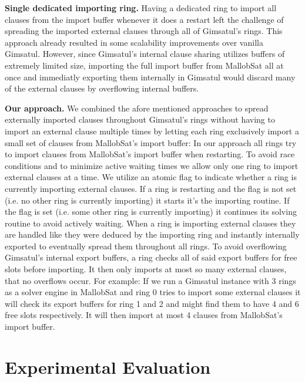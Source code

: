 \documentclass[12pt,a4paper,twoside]{scrartcl}
\numberwithin{equation}{section}
\begin{document}
\textbf{Single dedicated importing ring.} Having a dedicated ring to import all clauses from the import buffer whenever it does a restart left the challenge of spreading the imported external clauses through all of Gimsatul's rings. This approach already resulted in some scalability improvements over vanilla Gimsatul. However, since Gimsatul's internal clause sharing utilizes buffers of extremely limited size, importing the full import buffer from MallobSat all at once and immediatly exporting them internally in Gimsatul would discard many of the external clauses by overflowing internal buffers.

\textbf{Our approach.} We combined the afore mentioned approaches to spread externally imported clauses throughout Gimsatul's rings without having to import an external clause multiple times by letting each ring exclusively import a small set of clauses from MallobSat's import buffer: 
In our approach all rings try to import clauses from MallobSat's import buffer when restarting. To avoid race conditions and to minimize active waiting times we allow only one ring to import external clauses at a time. We utilize an atomic flag to indicate whether a ring is currently importing external clauses. If a ring is restarting and the flag is not set (i.e. no other ring is currently importing) it starts it's the importing routine. If the flag is set (i.e. some other ring is currently importing) it continues its solving routine to avoid actively waiting. 
When a ring is importing external clauses they are handled like they were deduced by the importing ring and instantly internally exported to eventually spread them throughout all rings. 
To avoid overflowing Gimsatul's internal export buffers, a ring checks all of said export buffers for free slots before importing. It then only imports at most so many external clauses, that no overflows occur. For example: If we run a Gimsatul instance with 3 rings as a solver engine in MallobSat and ring 0 tries to import some external clauses it will check its export buffers for ring 1 and 2 and might find them to have 4 and 6 free slots respectively. It will then import at most 4 clauses from MallobSat's import buffer.


\newpage
\section{Experimental Evaluation}
\end{document}
